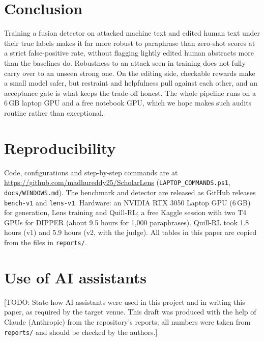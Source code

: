 \documentclass[11pt]{article}
\newcommand{\todo}[1]{\textcolor{red!70!black}{[TODO: #1]}}
\begin{document}
\section{Conclusion}

Training a fusion detector on attacked machine text and edited human text under their true labels makes it far more robust to paraphrase than zero-shot scores at a strict false-positive rate, without flagging lightly edited human abstracts more than the baselines do.
Robustness to an attack seen in training does not fully carry over to an unseen strong one.
On the editing side, checkable rewards make a small model safer, but restraint and helpfulness pull against each other, and an acceptance gate is what keeps the trade-off honest.
The whole pipeline runs on a 6\,GB laptop GPU and a free notebook GPU, which we hope makes such audits routine rather than exceptional.

\section*{Reproducibility}

Code, configurations and step-by-step commands are at \url{https://github.com/madhureddy25/ScholarLens} (\texttt{LAPTOP\_COMMANDS.ps1}, \texttt{docs/WINDOWS.md}).
The benchmark and detector are released as GitHub releases \texttt{bench-v1} and \texttt{lens-v1}.
Hardware: an NVIDIA RTX 3050 Laptop GPU (6\,GB) for generation, Lens training and Quill-RL; a free Kaggle session with two T4 GPUs for DIPPER (about 9.5 hours for 1{,}000 paraphrases).
Quill-RL took 1.8 hours (v1) and 5.9 hours (v2, with the judge).
All tables in this paper are copied from the files in \texttt{reports/}.

\section*{Use of AI assistants}

\todo{State how AI assistants were used in this project and in writing this paper, as required by the target venue. This draft was produced with the help of Claude (Anthropic) from the repository's reports; all numbers were taken from \texttt{reports/} and should be checked by the authors.}



\end{document}
